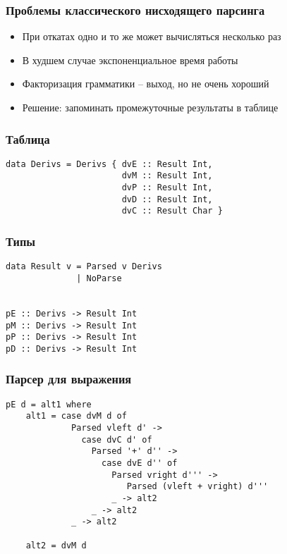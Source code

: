 \documentclass{beamer}
\begin{document}
\begin{frame}[fragile]
  \transwipe[direction=90]
  \frametitle{Проблемы классического нисходящего парсинга}
  \begin{itemize}
    \item При откатах одно и то же может вычисляться несколько раз
    \item В худшем случае экспоненциальное время работы
    \item Факторизация грамматики -- выход, но не очень хороший
  \end{itemize}

  \begin{itemize}
    \item Решение: запоминать промежуточные результаты в таблице
  \end{itemize}

\end{frame}

\begin{frame}[fragile]
  \transwipe[direction=90]
  \frametitle{Таблица}
\begin{verbatim}
data Derivs = Derivs { dvE :: Result Int,
                       dvM :: Result Int,
                       dvP :: Result Int,
                       dvD :: Result Int,
                       dvC :: Result Char }
\end{verbatim}
\end{frame}

\begin{frame}[fragile]
  \transwipe[direction=90]
  \frametitle{Типы}
\begin{verbatim}
data Result v = Parsed v Derivs
              | NoParse


pE :: Derivs -> Result Int
pM :: Derivs -> Result Int
pP :: Derivs -> Result Int
pD :: Derivs -> Result Int
\end{verbatim}
\end{frame}

\begin{frame}[fragile]
  \transwipe[direction=90]
  \frametitle{Парсер для выражения}
\begin{verbatim}
pE d = alt1 where
    alt1 = case dvM d of
             Parsed vleft d' ->
               case dvC d' of
                 Parsed '+' d'' ->
                   case dvE d'' of
                     Parsed vright d''' ->
                        Parsed (vleft + vright) d'''
                     _ -> alt2
                 _ -> alt2
             _ -> alt2

    alt2 = dvM d
\end{verbatim}
\end{frame}
\end{document}
